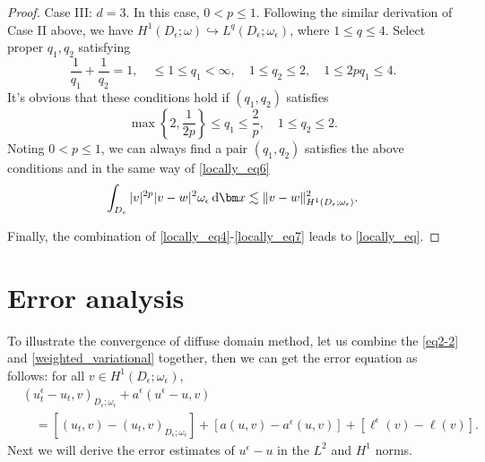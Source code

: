 \documentclass[3p,times]{elsarticle}
\numberwithin{equation}{section}
\newcommand{\dd}{\,{\rm d}}
\begin{document}
\begin{proof}
	Case III: $d=3$. In this case, $0<p\leq 1$. Following the similar derivation of Case II above, we have $H^1(D_{\epsilon};\omega)\hookrightarrow L^q(D_{\epsilon};\omega_{\epsilon})$, where $1\leq q \leq 4$. Select proper $q_1,q_2$ satisfying
	\begin{equation*}
		\frac{1}{q_1}+\frac{1}{q_2}=1,\quad \leq 1 \leq q_1<\infty,\quad 1\leq q_2\leq 2,\quad 1 \leq 2pq_1\leq 4.
	\end{equation*}
	It's obvious that these conditions hold if $(q_1,q_2)$ satisfies
	\begin{equation*}
		\max\left\{2,\frac{1}{2p} \right\}\leq q_1\leq \frac{2}{p},\quad 1 \leq q_2\leq 2.
	\end{equation*}
	Noting $0<p\leq 1$, we can always find a pair $(q_1,q_2)$ satisfies the above conditions and in the same way of \eqref{locally_eq6}
	\begin{equation}
		\label{locally_eq7}
		\int_{D_{\epsilon}}|v|^{2p}|v-w|^2\omega_{\epsilon}\dd\bm x\lesssim \|v-w\|_{H^1(D_{\epsilon};\omega_{\epsilon})}^2.
	\end{equation}
	
	Finally, the combination of \eqref{locally_eq4}-\eqref{locally_eq7} leads to \eqref{locally_eq}.
	
	
	
\end{proof}


\section{Error analysis}\label{theory}
To illustrate the convergence of diffuse domain method, let us combine the \eqref{eq2-2} and \eqref{weighted_variational} together, then we can get the error equation as follows: for all $v \in H^1(D_{\epsilon};\omega_{\epsilon})$,
\begin{equation}
	\label{eq4-1}
	\begin{split}
		&\left(u_t^{\epsilon}-u_t,v\right)_{D_{\epsilon};\omega_{\epsilon}}+a^{\epsilon}(u^{\epsilon}-u,v)\\
		&\quad=[\left(u_t,v\right)-\left(u_t,v\right)_{D_{\epsilon};\omega_{\epsilon}}]+[a(u,v)-a^{\epsilon}(u,v)]+[\ell^{\epsilon}(v)-\ell(v)].
	\end{split}
\end{equation}
Next we will derive the error estimates of $u^{\epsilon}-u$ in the $L^2$ and $H^1$ norms.%
\end{document}
